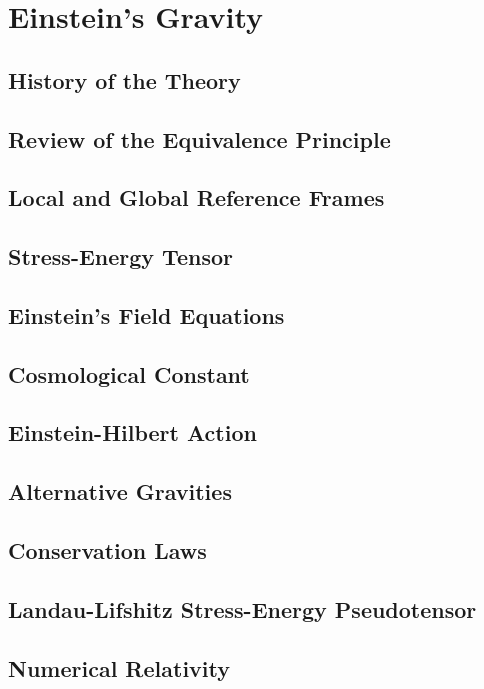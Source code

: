 \setchapterpreamble[u]{\margintoc}
\chapter{Einstein's Gravity}

\section{History of the Theory}
\section{Review of the Equivalence Principle}
\section{Local and Global Reference Frames}
\section{Stress-Energy Tensor}
\section{Einstein's Field Equations}
\section{Cosmological Constant}
\section{Einstein-Hilbert Action}
\section{Alternative Gravities}
\section{Conservation Laws}
\section{Landau-Lifshitz Stress-Energy Pseudotensor}
\section{Numerical Relativity}